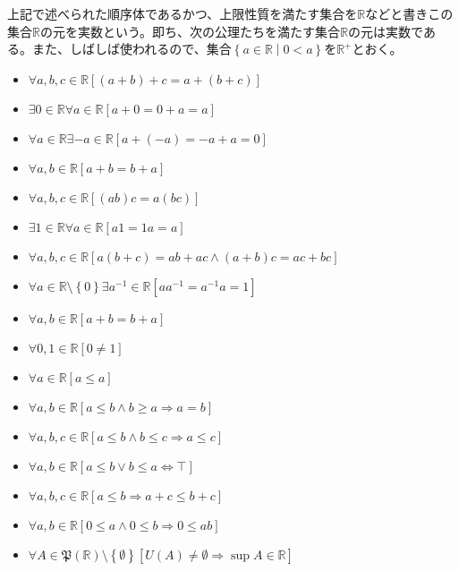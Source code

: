 \documentclass[dvipdfmx]{jsarticle}
\begin{document}
\begin{axs}
上記で述べられた順序体であるかつ、上限性質を満たす集合を$\mathbb{R}$などと書きこの集合$\mathbb{R}$の元を実数という。即ち、次の公理たちを満たす集合$\mathbb{R}$の元は実数である。また、しばしば使われるので、集合$\left\{ a \in \mathbb{R} \middle| 0 < a \right\}$を$\mathbb{R}^{+}$とおく。
\begin{itemize}
\item
  $\forall a,b,c \in \mathbb{R}\left[ (a + b) + c = a + (b + c) \right]$
\item
  $\exists 0 \in \mathbb{R}\forall a \in \mathbb{R}[ a + 0 = 0 + a = a]$
\item
  $\forall a \in \mathbb{R}\exists - a \in \mathbb{R}\left[ a + ( - a) = - a + a = 0 \right]$
\item
  $\forall a,b \in \mathbb{R}[ a + b = b + a]$
\item
  $\forall a,b,c \in \mathbb{R}\left[ (ab)c = a(bc) \right]$
\item
  $\exists 1 \in \mathbb{R}\forall a \in \mathbb{R}[ a1 = 1a = a]$
\item
  $\forall a,b,c \in \mathbb{R}\left[ a(b + c) = ab + ac \land (a + b)c = ac + bc \right]$
\item
  $\forall a \in \mathbb{R} \setminus \left\{ 0 \right\}\exists a^{- 1} \in \mathbb{R}\left[ aa^{- 1} = a^{- 1}a = 1 \right]$
\item
  $\forall a,b \in \mathbb{R}[ a + b = b + a]$
\item
  $\forall 0,1 \in \mathbb{R}[ 0 \neq 1]$
\item
  $\forall a \in \mathbb{R}[ a \leq a]$
\item
  $\forall a,b \in \mathbb{R}[ a \leq b \land b \geq a \Rightarrow a = b]$
\item
  $\forall a,b,c \in \mathbb{R}[ a \leq b \land b \leq c \Rightarrow a \leq c]$
\item
  $\forall a,b \in \mathbb{R}[ a \leq b \vee b \leq a \Leftrightarrow \top]$
\item
  $\forall a,b,c \in \mathbb{R}[ a \leq b \Rightarrow a + c \leq b + c]$
\item
  $\forall a,b \in \mathbb{R}[ 0 \leq a \land 0 \leq b \Rightarrow 0 \leq ab]$
\item
  $\forall A \in \mathfrak{P}\left( \mathbb{R} \right) \setminus \left\{ \emptyset \right\}\left[ U(A) \neq \emptyset \Rightarrow \sup A \in \mathbb{R} \right]$
\end{itemize}
\end{axs}
\end{document}
